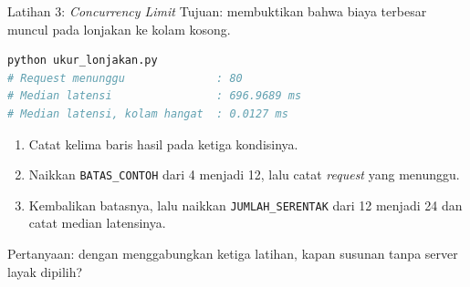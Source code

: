 \documentclass[aspectratio=169, table, 12pt]{beamer}
\begin{document}
\begin{frame}[fragile]{{\Large Latihan 3: \textit{Concurrency Limit}}}
  \vspace{8pt}
  {\small Tujuan: membuktikan bahwa biaya terbesar muncul pada lonjakan ke
  kolam kosong.}
  \vspace{2pt}
\begin{lstlisting}[language=bash]
python ukur_lonjakan.py
# Request menunggu              : 80
# Median latensi                : 696.9689 ms
# Median latensi, kolam hangat  : 0.0127 ms
\end{lstlisting}
  \begin{enumerate}\small
    \item Catat kelima baris hasil pada ketiga kondisinya.
    \item Naikkan \texttt{BATAS\_CONTOH} dari 4 menjadi 12, lalu catat
          \textit{request} yang menunggu.
    \item Kembalikan batasnya, lalu naikkan \texttt{JUMLAH\_SERENTAK} dari 12
          menjadi 24 dan catat median latensinya.
  \end{enumerate}
  {\small Pertanyaan: dengan menggabungkan ketiga latihan, kapan susunan tanpa
  server layak dipilih?}
\end{frame}
\end{document}
